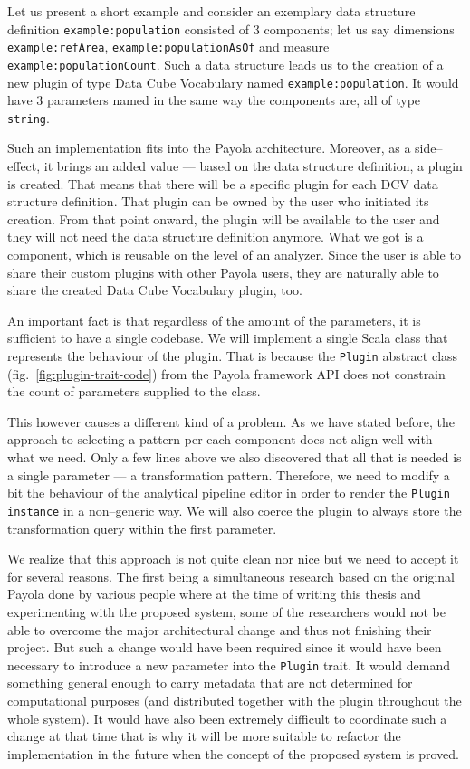 \begin{sloppypar}
Let us present a short example and consider an exemplary data structure definition \texttt{example:population}
consisted of 3 
components; let us say dimensions \texttt{example:refArea}, \texttt{example:populationAsOf}
and measure \texttt{example:populationCount}. Such a data structure leads us to 
the creation of a new plugin of type Data Cube Vocabulary named 
\texttt{example:population}. It would have 3 parameters named in the same way the 
components are, all of type \texttt{string}.
\end{sloppypar}

Such an implementation fits into the Payola architecture. Moreover, as a side--effect, it brings
an added value --- based on the data structure definition, a plugin is created. 
That means that there will be a specific plugin for each DCV data structure 
definition. That plugin can be owned by the user who initiated its creation. 
From that point onward, the plugin will be available to the user and they
will not need the data structure definition anymore. What we got is a 
component, which is reusable on the level of an analyzer. Since the user is able to 
share their custom plugins with other Payola users, they are
naturally able to share the created Data Cube Vocabulary plugin, too. 

An important fact is that regardless of the amount of the parameters, it is sufficient 
to have a single codebase. We will implement a single Scala class that represents the behaviour 
of the plugin. That is because the \texttt{Plugin} abstract class (fig.~\ref{fig:plugin-trait-code})
from the Payola framework
API does not constrain the count of parameters supplied to the class.

This however causes a different kind of a problem. As we have stated before, the 
approach to selecting a pattern per each component does not align well with what we 
need. Only a few lines above we also discovered that all that is needed is a 
single parameter --- a transformation pattern. Therefore, we need to modify a bit the 
behaviour of the analytical pipeline editor in order to render the \texttt{Plugin instance}
in a non--generic way. We will also coerce the plugin to always store the transformation query 
within the first parameter.

We realize that this approach is not quite clean nor nice but we need to accept it for several reasons.
The first being a simultaneous research based on the original Payola done by various people where
at the time of writing this thesis and experimenting with the proposed system, some of the researchers 
would not be able to overcome the major architectural change and thus not finishing their project.
But such a change would have been required since 
it would have been necessary to introduce a new parameter into the \texttt{Plugin} trait. 
It would demand something general enough to carry metadata that are not determined for 
computational purposes (and distributed together with the plugin throughout the whole system).
It would have also been extremely difficult to coordinate such 
a change at that time that is why it will be more suitable to refactor the 
implementation in the future when the concept of the proposed system is 
proved.

